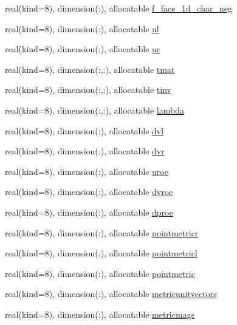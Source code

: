 \begin{DoxyCompactItemize}
\item 
real(kind=8), dimension(\+:), allocatable \hyperlink{structnavierstokesrhsweno_1_1dissipation__local_af61d496e7bd3e0b2c7c4ae459886b50b}{f\+\_\+face\+\_\+1d\+\_\+char\+\_\+neg}
\item 
real(kind=8), dimension(\+:), allocatable \hyperlink{structnavierstokesrhsweno_1_1dissipation__local_a5c06967f28c037eba665af6d7fa98c25}{ul}
\item 
real(kind=8), dimension(\+:), allocatable \hyperlink{structnavierstokesrhsweno_1_1dissipation__local_ac96095150a233114bab88fc0c1f4adc9}{ur}
\item 
real(kind=8), dimension(\+:,\+:), allocatable \hyperlink{structnavierstokesrhsweno_1_1dissipation__local_ab4126ba86ef24d63664fd42eb6e8c12c}{tmat}
\item 
real(kind=8), dimension(\+:,\+:), allocatable \hyperlink{structnavierstokesrhsweno_1_1dissipation__local_af7fa31bb1e449e84da7f1aee46de5493}{tinv}
\item 
real(kind=8), dimension(\+:,\+:), allocatable \hyperlink{structnavierstokesrhsweno_1_1dissipation__local_a06fae66e26066a611fba44cd88ef3956}{lambda}
\item 
real(kind=8), dimension(\+:), allocatable \hyperlink{structnavierstokesrhsweno_1_1dissipation__local_a5a45a3f309780c73848885e60e2397e4}{dvl}
\item 
real(kind=8), dimension(\+:), allocatable \hyperlink{structnavierstokesrhsweno_1_1dissipation__local_a6647a7f6936f963962f32fbe43184f40}{dvr}
\item 
real(kind=8), dimension(\+:), allocatable \hyperlink{structnavierstokesrhsweno_1_1dissipation__local_a4b35081ba10de71781c05a62571d76a5}{uroe}
\item 
real(kind=8), dimension(\+:), allocatable \hyperlink{structnavierstokesrhsweno_1_1dissipation__local_aea2e5de12e487d374577c020305b3d64}{dvroe}
\item 
real(kind=8), dimension(\+:), allocatable \hyperlink{structnavierstokesrhsweno_1_1dissipation__local_ad7daefaf4894be9ce008e1ba521c9833}{dproe}
\item 
real(kind=8), dimension(\+:), allocatable \hyperlink{structnavierstokesrhsweno_1_1dissipation__local_abea8ce75d2b4007920da3c75b5bc70d4}{pointmetricr}
\item 
real(kind=8), dimension(\+:), allocatable \hyperlink{structnavierstokesrhsweno_1_1dissipation__local_a7f1e3c3f595690164cb8bbf7bbd41b80}{pointmetricl}
\item 
real(kind=8), dimension(\+:), allocatable \hyperlink{structnavierstokesrhsweno_1_1dissipation__local_a63bb950c5ab0f336ef9538935944d0fc}{pointmetric}
\item 
real(kind=8), dimension(\+:), allocatable \hyperlink{structnavierstokesrhsweno_1_1dissipation__local_a71d05dbf0f57671a5bd625e056830e5f}{metricunitvectors}
\item 
real(kind=8), dimension(\+:), allocatable \hyperlink{structnavierstokesrhsweno_1_1dissipation__local_ad67c0bcebcc2ec1c9216309d94e198fb}{metricmags}
\end{DoxyCompactItemize}


